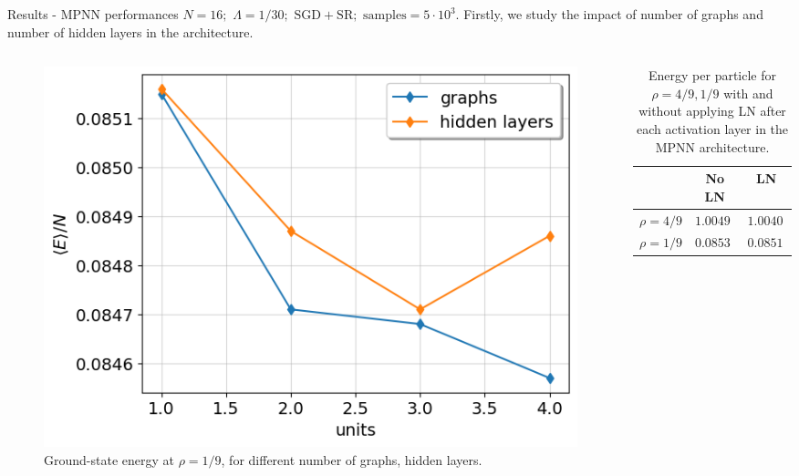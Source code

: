 \documentclass{beamer}
\begin{document}
\begin{frame}{Results - MPNN performances}
$N=16;\hspace{4pt}\Lambda=1/30;\hspace{4pt}\text{SGD}+\text{SR};\hspace{4pt}\text{samples}=5\cdot10^3$.
Firstly, we study the impact of number of graphs and number of hidden layers in the architecture.
\begin{columns}

  \begin{column}{0.55\textwidth}
  \begin{figure}
    \centering
    \includegraphics[scale=0.4]{figures/gs_energy_diff_graphs_and_lyrs.png}
    \caption{Ground-state energy at $\rho=1/9$, for different number of graphs, hidden layers.}
  \end{figure}
  \end{column}

  \begin{column}{0.45\textwidth}
    \begin{table}[H]
      \centering
      \caption{Energy per particle for $\rho = 4/9, 1/9$ with and without applying LN after each activation 
      layer in the MPNN architecture.}
      \begin{tabular}{|c|c|c|}
          \hline
          & No \textbf{LN} & \textbf{LN} \\
          \hline
          \hline
          $\rho = 4/9$ & $1.00498$ & $1.00403$ \\
          \hline
          $\rho = 1/9$ &  $0.08534$ & $0.08515$ \\
          \hline
      \end{tabular}
  
  \end{table}
  \end{column}

\end{columns}
\end{frame}
\end{document}

